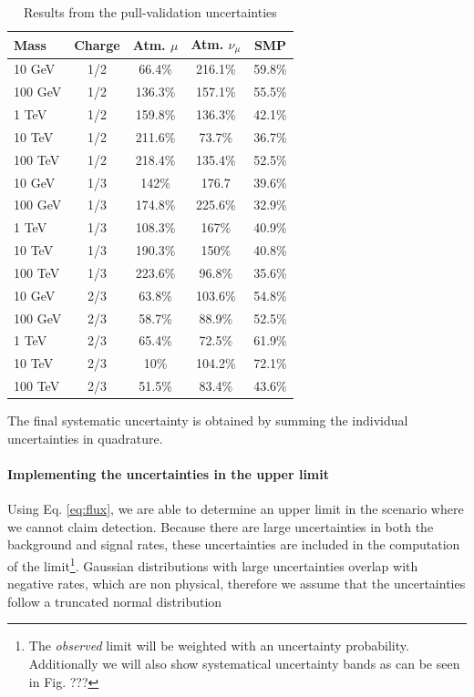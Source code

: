 \begin{table}[]
\centering
\caption{Results from the pull-validation uncertainties}
\label{tab:pvuncertainties}
\begin{tabular}{|
>{\columncolor[HTML]{F1A91E}}l |c|c|c|c|}
\hline
Mass & \cellcolor[HTML]{F1A91E}Charge & \cellcolor[HTML]{F1A91E}Atm. $\mu$ & \cellcolor[HTML]{F1A91E}Atm. $\nu_\mu$ & \cellcolor[HTML]{F1A91E}SMP \\ \hline
10 GeV & 1/2 & 66.4\% & 216.1\% & 59.8\% \\ \hline
100 GeV & 1/2 & 136.3\% & 157.1\% & 55.5\% \\ \hline
1 TeV & 1/2 & 159.8\% & 136.3\% & 42.1\% \\ \hline
10 TeV & 1/2 & 211.6\% & 73.7\% & 36.7\% \\ \hline
100 TeV & 1/2 & 218.4\% & 135.4\% & 52.5\% \\ \hline
10 GeV & 1/3 & 142\% & 176.7 & 39.6\% \\ \hline
100 GeV & 1/3 & 174.8\% & 225.6\% & 32.9\% \\ \hline
1 TeV & 1/3 & 108.3\% & 167\% & 40.9\% \\ \hline
10 TeV & 1/3 & 190.3\% & 150\% & 40.8\% \\ \hline
100 TeV & 1/3 & 223.6\% & 96.8\% & 35.6\% \\ \hline
10 GeV & 2/3 & 63.8\% & 103.6\% & 54.8\% \\ \hline
100 GeV & 2/3 & 58.7\% & 88.9\% & 52.5\% \\ \hline
1 TeV & 2/3 & 65.4\% & 72.5\% & 61.9\% \\ \hline
10 TeV & 2/3 & 10\% & 104.2\% & 72.1\% \\ \hline
100 TeV & 2/3 & 51.5\% & 83.4\% & 43.6\% \\ \hline
\end{tabular}
\end{table}

\noindent The final systematic uncertainty is obtained by summing the individual uncertainties in quadrature.

\paragraph{Implementing the uncertainties in the upper limit}
Using Eq. \ref{eq:flux}, we are able to determine an upper limit in the scenario where we cannot claim detection. Because there are large uncertainties in both the background and signal rates, these uncertainties are included in the computation of the limit\footnote{The \textit{observed} limit will be weighted with an uncertainty probability. Additionally we will also show systematical uncertainty bands as can be seen in Fig. ???}. Gaussian distributions with large uncertainties overlap with negative rates, which are non physical, therefore we assume that the uncertainties follow a truncated normal distribution 

